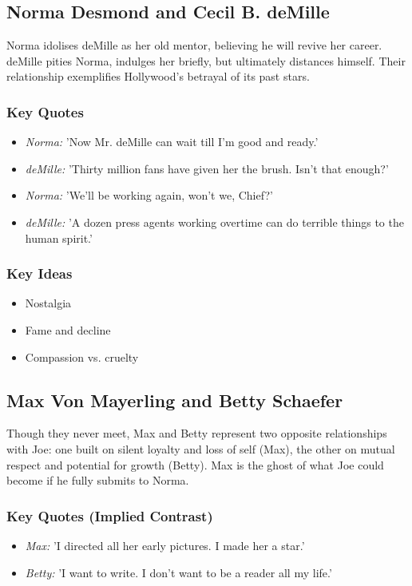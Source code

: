 \documentclass[a4paper]{article}
\begin{document}
\subsection{Norma Desmond and Cecil B. deMille}
Norma idolises deMille as her old mentor, believing he will revive her career. deMille pities Norma, indulges her briefly, but ultimately distances himself. Their relationship exemplifies Hollywood’s betrayal of its past stars.

\subsubsection*{Key Quotes}
\begin{itemize}
    \item \textit{Norma:} 'Now Mr. deMille can wait till I'm good and ready.'
    \item \textit{deMille:} 'Thirty million fans have given her the brush. Isn’t that enough?'
    \item \textit{Norma:} 'We'll be working again, won't we, Chief?'
    \item \textit{deMille:} 'A dozen press agents working overtime can do terrible things to the human spirit.'
\end{itemize}

\subsubsection*{Key Ideas}
\begin{itemize}
    \item Nostalgia
    \item Fame and decline
    \item Compassion vs. cruelty
\end{itemize}

\subsection{Max Von Mayerling and Betty Schaefer}
Though they never meet, Max and Betty represent two opposite relationships with Joe: one built on silent loyalty and loss of self (Max), the other on mutual respect and potential for growth (Betty). Max is the ghost of what Joe could become if he fully submits to Norma.

\subsubsection*{Key Quotes (Implied Contrast)}
\begin{itemize}
    \item \textit{Max:} 'I directed all her early pictures. I made her a star.'
    \item \textit{Betty:} 'I want to write. I don’t want to be a reader all my life.'
\end{itemize}
\end{document}
